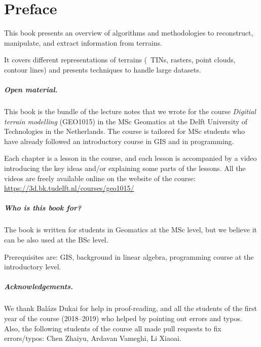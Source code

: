 


\chapter*{Preface}

This book presents an overview of algorithms and methodologies to reconstruct, manipulate, and extract information from terrains.

It covers different representations of terrains (\eg\ TINs, rasters, point clouds, contour lines) and presents techniques to handle large datasets.



\paragraph*{Open material.}
This book is the bundle of the lecture notes that we wrote for the course \emph{Digitial terrain modelling} (GEO1015) in the MSc Geomatics at the Delft University of Technologies in the Netherlands.
The course is tailored for MSc students who have already followed an introductory course in GIS and in programming.

Each chapter is a lesson in the course, and each lesson is accompanied by a video introducing the key ideas and/or explaining some parts of the lessons.
All the videos are freely available online on the website of the course: \url{https://3d.bk.tudelft.nl/courses/geo1015/}


\paragraph*{Who is this book for?}
The book is written for students in Geomatics at the MSc level, but we believe it can be also used at the BSc level.

Prerequisites are: GIS, background in linear algebra, programming course at the introductory level.


\paragraph*{Acknowledgements.}
We thank Balázs Dukai for help in proof-reading, and all the students of the first year of the course (2018--2019) who helped by pointing out errors and typos.
Also, the following students of the course all made pull requests to fix errors/typos: Chen Zhaiyu, Ardavan Vameghi, Li Xiaoai.






